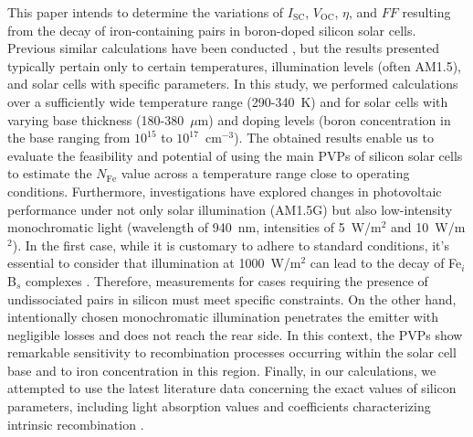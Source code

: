 \documentclass[a4paper,fleqn]{cas-sc}
\begin{document}
This paper intends to determine the variations of $I_\mathrm{SC}$, $V_\mathrm{OC}$, $\eta$, and $F\!F$
resulting from the decay of iron-containing pairs in boron-doped silicon solar cells.
Previous similar calculations have been conducted \cite{FeB:Schmidt,IronSC,Hajjiah2020},
but the results presented typically pertain only to certain temperatures,
illumination levels (often AM1.5), and solar cells with specific parameters.
In this study, we performed calculations over a sufficiently wide temperature range (290-340~K)
and for solar cells with varying base thickness (180-380~$\mu$m) and doping levels
(boron concentration in the base ranging from $10^{15}$ to $10^{17}$~cm$^{-3}$).
The obtained results enable us to evaluate the feasibility and potential of using the main PVPs of silicon solar cells to estimate the $N_\mathrm{Fe}$  value across a temperature range close to operating conditions.
Furthermore, investigations have explored changes in photovoltaic performance under not only solar illumination (AM1.5G)
but also low-intensity monochromatic light (wavelength of 940~nm, intensities of 5~W/m$^{2}$ and 10~W/m$^{2}$).
In the first case, while it is customary to adhere to standard conditions,
it's essential to consider that illumination at 1000~W/m$^{2}$ can lead to the decay of Fe$_i$B$_s$ complexes \cite{Macdonald2004}.
Therefore, measurements for cases requiring the presence of undissociated pairs in silicon must meet specific constraints.
On the other hand, intentionally chosen monochromatic illumination penetrates the emitter with negligible losses and does not reach the rear side.
In this context, the PVPs show remarkable sensitivity
to recombination processes occurring within the solar cell base and to iron concentration in this region.
Finally, in our calculations, we attempted to use the latest literature data
concerning the exact values of silicon parameters, including light absorption values \cite{Green2022}
and coefficients characterizing intrinsic recombination \cite{Brad2022,AugerSi2022}.
\end{document}
